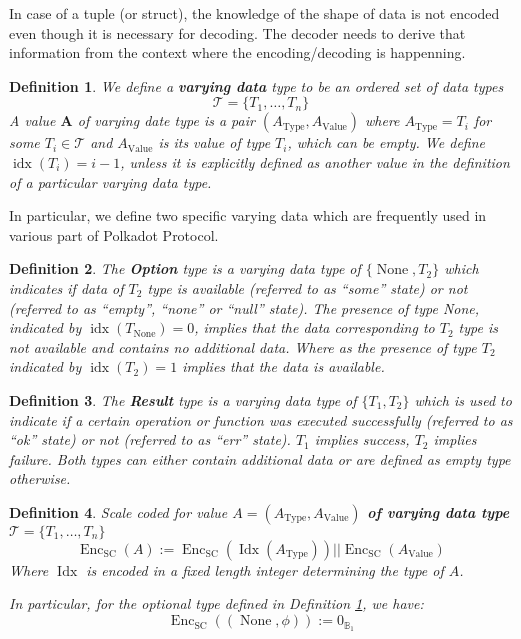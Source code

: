 \documentclass{book}
\newcommand{\assign}{:=}
\newcommand{\tmmathbf}[1]{\ensuremath{\boldsymbol{#1}}}
\newcommand{\tmop}[1]{\ensuremath{\operatorname{#1}}}
\newcommand{\tmstrong}[1]{\textbf{#1}}
\newcommand{\tmtextbf}[1]{{\bfseries{#1}}}
\newtheorem{definition}{Definition}
\providecommand{\tmop}[1]{\ensuremath{\mathrm{#1}}}
\providecommand{\tmstrong}[1]{\tmtextbf{#1}}
\providecommand{\tmtextbf}[1]{\tmtextbf{#1}}
\newtheorem{definition}{Definition}
\begin{document}
In case of a tuple (or struct), the knowledge of the shape of data is not
encoded even though it is necessary for decoding. The decoder needs to derive
that information from the context where the encoding/decoding is happenning.

\begin{definition}
  \label{defn-varrying-data-type}We define a {\tmstrong{varying data}} type to
  be an ordered set of data types
  \[ \mathcal{T}= \{ T_1, \ldots, T_n \} \]
  A value $\tmmathbf{A}$ of varying date type is a pair $(A_{\tmop{Type}},
  A_{\tmop{Value}})$ where $A_{\tmop{Type}} = T_i$ for some $T_i \in
  \mathcal{T}$ and $A_{\tmop{Value}}$ is its value of type $T_i$, which can be
  empty. We define $\tmop{idx} (T_i) = i - 1$, unless it is explicitly defined
  as another value in the definition of a particular varying data type.
\end{definition}

In particular, we define two specific varying data which are frequently used
in various part of Polkadot Protocol.

\begin{definition}
  $\label{defn-option-type}$The {\tmstrong{Option}} type is a varying data
  type of $\{\tmop{None}, T_2 \}$ which indicates if data of $T_2$ type is
  available (referred to as ``some'' state) or not (referred to as ``empty'',
  ``none'' or ``null'' state). The presence of type None, indicated by
  $\tmop{idx} (T_{\tmop{None}}) = 0$, implies that the data corresponding to
  $T_2$ type is not available and contains no additional data. Where as the
  presence of type $T_2$ indicated by $\tmop{idx} (T_2) = 1$ implies that the
  data is available.
\end{definition}

\begin{definition}
  \label{defn-result-type}The {\tmstrong{Result}} type is a varying data type
  of $\{ T_1, T_2 \}$ which is used to indicate if a certain operation or
  function was executed successfully (referred to as ``ok'' state) or not
  (referred to as ``err'' state). $T_1$ implies success, $T_2$ implies
  failure. Both types can either contain additional data or are defined as
  empty type otherwise.
\end{definition}

\begin{definition}
  \label{defn-scale-variable-type}Scale coded for value {\tmstrong{$A =
  (A_{\tmop{Type}}, A_{\tmop{Value}})$ of varying data type}} $\mathcal{T}= \{
  T_1, \ldots, T_n \}$
  \[ \tmop{Enc}_{\tmop{SC}} (A) \assign \tmop{Enc}_{\tmop{SC}} (\tmop{Idx}
     (A_{\tmop{Type}})) | | \tmop{Enc}_{\tmop{SC}} (A_{\tmop{Value}}) \]
  Where $\tmop{Idx}$ is encoded in a fixed length integer determining the type
  of $A$.
  
  In particular, for the optional type defined in Definition
  \ref{defn-varrying-data-type}, we have:
  \[ \tmop{Enc}_{\tmop{SC}} ((\tmop{None}, \phi)) \assign 0_{\mathbb{B}_1} \]
\end{definition}
\end{document}
